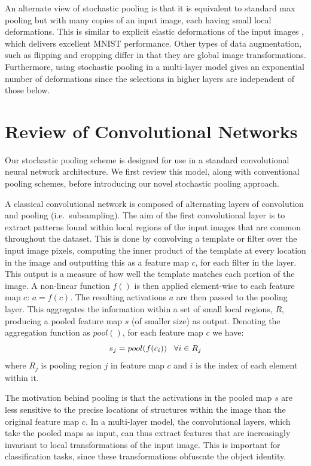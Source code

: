 \documentclass{article} %
\def\BE{\vspace{-0.0mm}\begin{equation}}
\def\EE{\vspace{-0.0mm}\end{equation}}
\begin{document}
An alternate view of stochastic pooling is that it is equivalent to
standard max pooling but with many copies of an input image, each
having small local deformations. This is similar to explicit elastic
deformations of the input images \cite{Simard03}, which delivers
excellent MNIST performance. Other types of data augmentation, such as
flipping and cropping differ in that they are global image
transformations. Furthermore, using stochastic pooling in a
multi-layer model gives an exponential number of deformations since
the selections in higher layers are independent of those below.

%

\section{Review of Convolutional Networks}

Our stochastic pooling scheme is designed for use in a standard
convolutional neural network architecture. We first review this model,
along with conventional pooling schemes, before introducing our novel
stochastic pooling approach.

A classical convolutional network is composed of alternating layers of
convolution and pooling (i.e.~subsampling).  The aim of the first
convolutional layer is to extract patterns found within local regions
of the input images that are common throughout the dataset.  This is
done by convolving a template or filter over the input image pixels,
computing the inner product of the template at every location in the
image and outputting this as a feature map $c$, for each filter in the
layer. This output is a measure of how well the template matches each
portion of the image. A non-linear function $f()$ is then applied
element-wise to each feature map $c$: $a = f(c)$. The resulting
activations $a$ are then passed to the pooling layer. This aggregates
the information within a set of small local regions, $R$, producing a
pooled feature map $s$ (of smaller size) as output. Denoting the
aggregation function as $pool()$, for each feature map $c$ we have:
\BE s_j = pool(f(c_i)) \;\;\; \forall i \in R_j \EE where $R_j$ is
pooling region $j$ in feature map $c$ and $i$ is the index of each
element within it.

The motivation behind pooling is that the activations in the pooled map
$s$ are less sensitive to the precise locations of structures within
the image than the original feature map $c$. In a multi-layer model,
the convolutional layers, which take the pooled maps as input,
can thus extract features that are increasingly invariant to local
transformations of the input image. This is important for
classification tasks, since these transformations obfuscate the object
identity.
\end{document}
